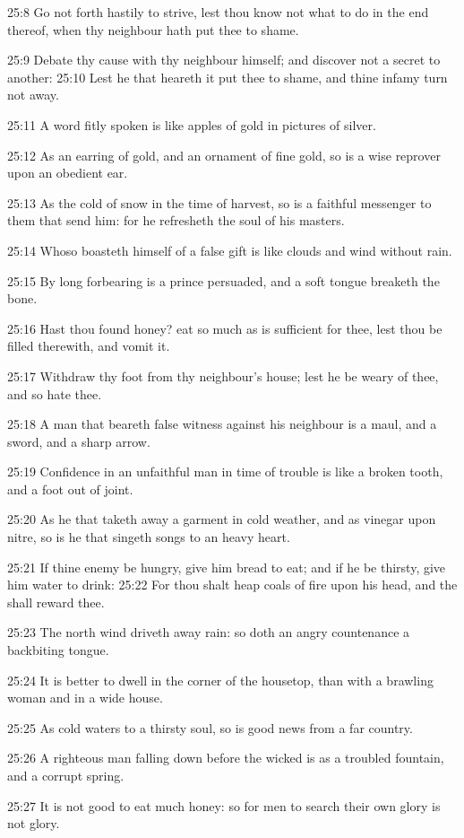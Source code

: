 25:8 Go not forth hastily to strive, lest thou know not what to do in the end thereof, when thy neighbour hath put thee to shame.

25:9 Debate thy cause with thy neighbour himself; and discover not a secret to another: 25:10 Lest he that heareth it put thee to shame, and thine infamy turn not away.

25:11 A word fitly spoken is like apples of gold in pictures of silver.

25:12 As an earring of gold, and an ornament of fine gold, so is a wise reprover upon an obedient ear.

25:13 As the cold of snow in the time of harvest, so is a faithful messenger to them that send him: for he refresheth the soul of his masters.

25:14 Whoso boasteth himself of a false gift is like clouds and wind without rain.

25:15 By long forbearing is a prince persuaded, and a soft tongue breaketh the bone.

25:16 Hast thou found honey? eat so much as is sufficient for thee, lest thou be filled therewith, and vomit it.

25:17 Withdraw thy foot from thy neighbour's house; lest he be weary of thee, and so hate thee.

25:18 A man that beareth false witness against his neighbour is a maul, and a sword, and a sharp arrow.

25:19 Confidence in an unfaithful man in time of trouble is like a broken tooth, and a foot out of joint.

25:20 As he that taketh away a garment in cold weather, and as vinegar upon nitre, so is he that singeth songs to an heavy heart.

25:21 If thine enemy be hungry, give him bread to eat; and if he be thirsty, give him water to drink: 25:22 For thou shalt heap coals of fire upon his head, and the \LORD shall reward thee.

25:23 The north wind driveth away rain: so doth an angry countenance a backbiting tongue.

25:24 It is better to dwell in the corner of the housetop, than with a brawling woman and in a wide house.

25:25 As cold waters to a thirsty soul, so is good news from a far country.

25:26 A righteous man falling down before the wicked is as a troubled fountain, and a corrupt spring.

25:27 It is not good to eat much honey: so for men to search their own glory is not glory.

